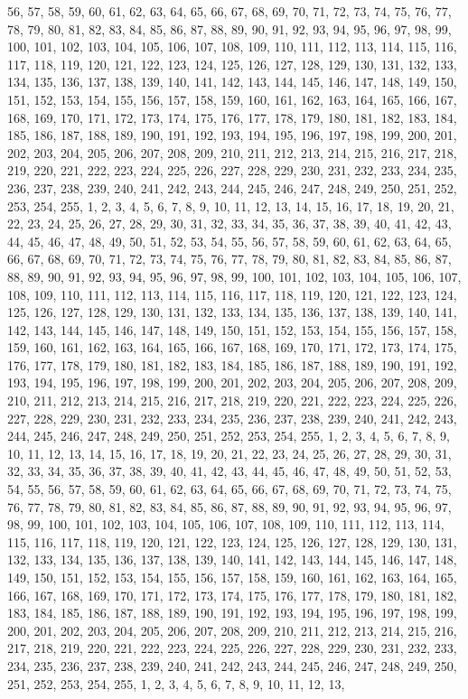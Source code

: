 56, 57, 58, 59, 60, 61, 62, 63, 64, 65, 66, 67, 68, 69, 70, 71, 72, 73, 74, 75, 76, 77, 78, 79, 80, 81, 82, 83, 84, 85, 86, 87, 88, 89, 90, 91, 92, 93, 94, 95, 96, 97, 98, 99, 100, 101, 102, 103, 104, 105, 106, 107, 108, 109, 110, 111, 112, 113, 114, 115, 116, 117, 118, 119, 120, 121, 122, 123, 124, 125, 126, 127, 128, 129, 130, 131, 132, 133, 134, 135, 136, 137, 138, 139, 140, 141, 142, 143, 144, 145, 146, 147, 148, 149, 150, 151, 152, 153, 154, 155, 156, 157, 158, 159, 160, 161, 162, 163, 164, 165, 166, 167, 168, 169, 170, 171, 172, 173, 174, 175, 176, 177, 178, 179, 180, 181, 182, 183, 184, 185, 186, 187, 188, 189, 190, 191, 192, 193, 194, 195, 196, 197, 198, 199, 200, 201, 202, 203, 204, 205, 206, 207, 208, 209, 210, 211, 212, 213, 214, 215, 216, 217, 218, 219, 220, 221, 222, 223, 224, 225, 226, 227, 228, 229, 230, 231, 232, 233, 234, 235, 236, 237, 238, 239, 240, 241, 242, 243, 244, 245, 246, 247, 248, 249, 250, 251, 252, 253, 254, 255, 1, 2, 3, 4, 5, 6, 7, 8, 9, 10, 11, 12, 13, 14, 15, 16, 17, 18, 19, 20, 21, 22, 23, 24, 25, 26, 27, 28, 29, 30, 31, 32, 33, 34, 35, 36, 37, 38, 39, 40, 41, 42, 43, 44, 45, 46, 47, 48, 49, 50, 51, 52, 53, 54, 55, 56, 57, 58, 59, 60, 61, 62, 63, 64, 65, 66, 67, 68, 69, 70, 71, 72, 73, 74, 75, 76, 77, 78, 79, 80, 81, 82, 83, 84, 85, 86, 87, 88, 89, 90, 91, 92, 93, 94, 95, 96, 97, 98, 99, 100, 101, 102, 103, 104, 105, 106, 107, 108, 109, 110, 111, 112, 113, 114, 115, 116, 117, 118, 119, 120, 121, 122, 123, 124, 125, 126, 127, 128, 129, 130, 131, 132, 133, 134, 135, 136, 137, 138, 139, 140, 141, 142, 143, 144, 145, 146, 147, 148, 149, 150, 151, 152, 153, 154, 155, 156, 157, 158, 159, 160, 161, 162, 163, 164, 165, 166, 167, 168, 169, 170, 171, 172, 173, 174, 175, 176, 177, 178, 179, 180, 181, 182, 183, 184, 185, 186, 187, 188, 189, 190, 191, 192, 193, 194, 195, 196, 197, 198, 199, 200, 201, 202, 203, 204, 205, 206, 207, 208, 209, 210, 211, 212, 213, 214, 215, 216, 217, 218, 219, 220, 221, 222, 223, 224, 225, 226, 227, 228, 229, 230, 231, 232, 233, 234, 235, 236, 237, 238, 239, 240, 241, 242, 243, 244, 245, 246, 247, 248, 249, 250, 251, 252, 253, 254, 255, 1, 2, 3, 4, 5, 6, 7, 8, 9, 10, 11, 12, 13, 14, 15, 16, 17, 18, 19, 20, 21, 22, 23, 24, 25, 26, 27, 28, 29, 30, 31, 32, 33, 34, 35, 36, 37, 38, 39, 40, 41, 42, 43, 44, 45, 46, 47, 48, 49, 50, 51, 52, 53, 54, 55, 56, 57, 58, 59, 60, 61, 62, 63, 64, 65, 66, 67, 68, 69, 70, 71, 72, 73, 74, 75, 76, 77, 78, 79, 80, 81, 82, 83, 84, 85, 86, 87, 88, 89, 90, 91, 92, 93, 94, 95, 96, 97, 98, 99, 100, 101, 102, 103, 104, 105, 106, 107, 108, 109, 110, 111, 112, 113, 114, 115, 116, 117, 118, 119, 120, 121, 122, 123, 124, 125, 126, 127, 128, 129, 130, 131, 132, 133, 134, 135, 136, 137, 138, 139, 140, 141, 142, 143, 144, 145, 146, 147, 148, 149, 150, 151, 152, 153, 154, 155, 156, 157, 158, 159, 160, 161, 162, 163, 164, 165, 166, 167, 168, 169, 170, 171, 172, 173, 174, 175, 176, 177, 178, 179, 180, 181, 182, 183, 184, 185, 186, 187, 188, 189, 190, 191, 192, 193, 194, 195, 196, 197, 198, 199, 200, 201, 202, 203, 204, 205, 206, 207, 208, 209, 210, 211, 212, 213, 214, 215, 216, 217, 218, 219, 220, 221, 222, 223, 224, 225, 226, 227, 228, 229, 230, 231, 232, 233, 234, 235, 236, 237, 238, 239, 240, 241, 242, 243, 244, 245, 246, 247, 248, 249, 250, 251, 252, 253, 254, 255, 1, 2, 3, 4, 5, 6, 7, 8, 9, 10, 11, 12, 13, 